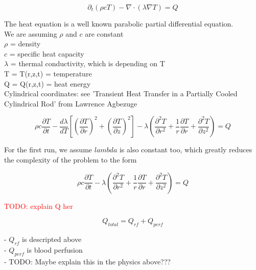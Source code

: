 \documentclass[parskip=half, titlepage=yes, 12pt, BCOR=12mm, DIV=calc]{scrartcl}
\begin{document}
\begin{equation}
    \partial_t (\rho c T) - \nabla \cdot (\lambda \nabla T) = Q
\end{equation}

The heat equation is a well known parabolic partial differential equation. \\

We are assuming $\rho$ and $c$ are constant \\
$\rho$ = density \\
$c$ = specific heat capacity \\
$\lambda$ = thermal conductivity, which is depending on T \\
T = T(r,z,t) = temperature \\
Q = Q(r,z,t) = heat energy \\


Cylindrical coordinates: see 'Transient Heat Transfer in a Partially Cooled Cylindrical Rod' from Lawrence Agbezuge

\begin{equation}
    \rho c \frac{\partial T}{\partial t} -  \frac{d\lambda}{dT} \left[ \left( \frac{\partial T}{\partial r} \right)^2 + \left( \frac{\partial T}{\partial z} \right)^2 \right] - \lambda \left( \frac{\partial^2 T}{\partial r^2} + \frac{1}{r} \frac{\partial T}{\partial r} + \frac{\partial^2 T}{\partial z^2} \right) = Q
\end{equation}

For the first run, we assume $lambda$ is also constant too, which greatly reduces the complexity of the problem to the form

\begin{equation}
    \rho c \frac{\partial T}{\partial t} - \lambda \left( \frac{\partial^2 T}{\partial r^2} + \frac{1}{r} \frac{\partial T}{\partial r} + \frac{\partial^2 T}{\partial z^2} \right) = Q
\end{equation}

\textcolor{red}{TODO: explain Q her}

\begin{equation}
    Q_{total} = Q_{rf} + Q_{perf}
\end{equation}

- $Q_{rf}$ is descripted above \\
- $Q_{perf}$ is blood perfusion \\
- TODO: Maybe explain this in the physics above??? \\
\end{document}
